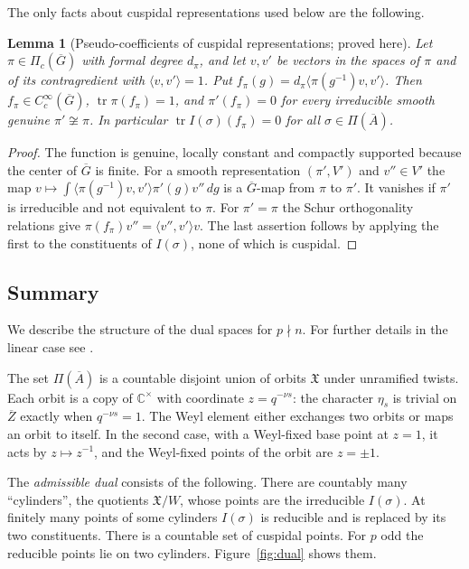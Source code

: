 \documentclass[12pt,letterpaper]{article}
\numberwithin{equation}{section}
\newtheorem{xlemma}[theorem]{Lemma}
\theoremstyle{definition}
\newcommand{\proved}{proved here}
\newcommand{\C}{\mathbb C}
\newcommand{\bG}{\overline{G}}
\newcommand{\bA}{\overline{A}}
\newcommand{\bZ}{\overline{Z}}
\newcommand{\fX}{\mathfrak X}
\DeclareMathOperator{\tr}{tr}
\begin{document}
The only facts about cuspidal representations used below are the following.

\begin{xlemma}[Pseudo-coefficients of cuspidal representations; \proved]\label{lem:pseudo}
Let $\pi\in\Pi_c(\bG)$ with formal degree $d_\pi$, and let $v,v'$ be vectors in the spaces
of $\pi$ and of its contragredient with $\langle v,v'\rangle=1$.  Put
$f_\pi(g)=d_\pi\langle\pi(g^{-1})v,v'\rangle$.  Then $f_\pi\in C_c^\infty(\bG)$,
$\tr\pi(f_\pi)=1$, and $\pi'(f_\pi)=0$ for every irreducible smooth genuine $\pi'\not\cong\pi$.
In particular $\tr I(\sigma)(f_\pi)=0$ for all $\sigma\in\Pi(\bA)$.
\end{xlemma}
\begin{proof}
The function is genuine, locally constant and compactly supported because the center of
$\bG$ is finite.  For a smooth representation $(\pi',V')$ and $v''\in V'$ the map
$v\mapsto\int\langle\pi(g^{-1})v,v'\rangle\pi'(g)v''\,dg$ is a $\bG$-map from $\pi$ to
$\pi'$.  It vanishes if $\pi'$ is irreducible and not equivalent to $\pi$.  For $\pi'=\pi$
the Schur orthogonality relations give $\pi(f_\pi)v''=\langle v'',v'\rangle v$.  The last
assertion follows by applying the first to the constituents of $I(\sigma)$, none of which
is cuspidal.
\end{proof}

\subsection{Summary}\label{subsec:summary-dual}

We describe the structure of the dual spaces for $p\nmid n$.  For further details in the
linear case see \cite{Jo94a}.

The set $\Pi(\bA)$ is a countable disjoint union of orbits $\fX$ under unramified twists.
Each orbit is a copy of $\C^\times$ with coordinate $z=q^{-\nu s}$: the character $\eta_s$
is trivial on $\bZ$ exactly when $q^{-\nu s}=1$.  The Weyl element either exchanges two
orbits or maps an orbit to itself.  In the second case, with a Weyl-fixed base point at
$z=1$, it acts by $z\mapsto z^{-1}$, and the Weyl-fixed points of the orbit are $z=\pm1$.

The \emph{admissible dual} consists of the following.  There are countably many
``cylinders'', the quotients $\fX/W$, whose points are the irreducible $I(\sigma)$.  At
finitely many points of some cylinders $I(\sigma)$ is reducible and is replaced by its two
constituents.  There is a countable set of cuspidal points.  For $p$ odd the reducible
points lie on two cylinders.  Figure~\ref{fig:dual} shows them.
\end{document}
